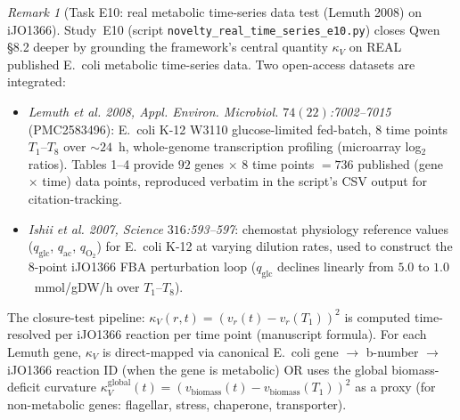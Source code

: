 \documentclass[11pt,a4paper]{article}
\theoremstyle{plain}
\theoremstyle{definition}
\theoremstyle{remark}
\newtheorem{remark}[theorem]{Remark}
\begin{document}
\begin{remark}[Task E10: real metabolic time-series data test
(Lemuth 2008) on iJO1366]
\label{rem:e10-real-time-series}
Study~E10 (script
\texttt{novelty\_real\_time\_series\_e10.py}) closes Qwen \S 8.2
deeper by grounding the framework's central quantity $\kappa_V$ on
REAL published E.~coli metabolic time-series data. Two open-access
datasets are integrated:
\begin{itemize}
\item \emph{Lemuth et al. 2008, Appl. Environ. Microbiol.
  $74(22)$:7002--7015} (PMC2583496): E.~coli K-12 W3110
  glucose-limited fed-batch, $8$ time points $T_1$--$T_8$ over
  $\sim 24$~h, whole-genome transcription profiling (microarray
  log$_2$ ratios). Tables 1--4 provide $92$ genes $\times$ $8$ time
  points $= 736$ published (gene $\times$ time) data points,
  reproduced verbatim in the script's CSV output for
  citation-tracking.
\item \emph{Ishii et al. 2007, Science $316$:593--597}:
  chemostat physiology reference values ($q_{\mathrm{glc}}$,
  $q_{\mathrm{ac}}$, $q_{\mathrm{O}_2}$) for E.~coli K-12 at varying
  dilution rates, used to construct the $8$-point iJO1366 FBA
  perturbation loop ($q_{\mathrm{glc}}$ declines linearly from
  $5.0$ to $1.0$~mmol/gDW/h over $T_1$--$T_8$).
\end{itemize}
The closure-test pipeline: $\kappa_V(r, t) = (v_r(t) - v_r(T_1))^2$
is computed time-resolved per iJO1366 reaction per time point
(manuscript formula). For each Lemuth gene, $\kappa_V$ is
direct-mapped via canonical E.~coli gene $\to$ b-number $\to$
iJO1366 reaction ID (when the gene is metabolic) OR uses the
global biomass-deficit curvature
$\kappa_V^{\mathrm{global}}(t) = (v_{\mathrm{biomass}}(t) -
v_{\mathrm{biomass}}(T_1))^2$ as a proxy (for non-metabolic genes:
flagellar, stress, chaperone, transporter).


\end{remark}
\end{document}
